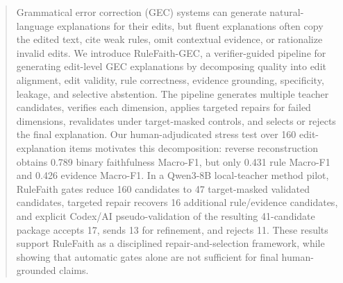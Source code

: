 \begin{abstract}
Grammatical error correction (GEC) systems can generate natural-language explanations for their edits, but fluent explanations often copy the edited text, cite weak rules, omit contextual evidence, or rationalize invalid edits. We introduce RuleFaith-GEC, a verifier-guided pipeline for generating edit-level GEC explanations by decomposing quality into edit alignment, edit validity, rule correctness, evidence grounding, specificity, leakage, and selective abstention. The pipeline generates multiple teacher candidates, verifies each dimension, applies targeted repairs for failed dimensions, revalidates under target-masked controls, and selects or rejects the final explanation. Our human-adjudicated stress test over 160 edit-explanation items motivates this decomposition: reverse reconstruction obtains 0.789 binary faithfulness Macro-F1, but only 0.431 rule Macro-F1 and 0.426 evidence Macro-F1. In a Qwen3-8B local-teacher method pilot, RuleFaith gates reduce 160 candidates to 47 target-masked validated candidates, targeted repair recovers 16 additional rule/evidence candidates, and explicit Codex/AI pseudo-validation of the resulting 41-candidate package accepts 17, sends 13 for refinement, and rejects 11. These results support RuleFaith as a disciplined repair-and-selection framework, while showing that automatic gates alone are not sufficient for final human-grounded claims.
\end{abstract}
